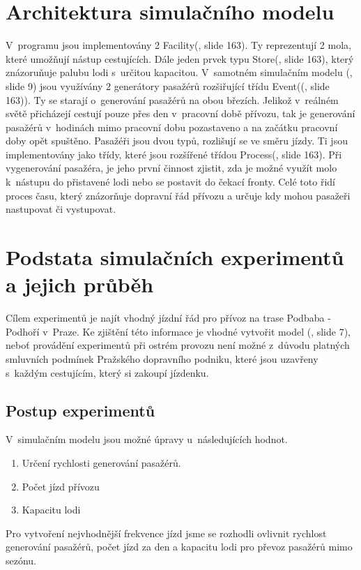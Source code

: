 \documentclass[11pt,a4paper]{article}
\begin{document}
	\section{Architektura simulačního modelu}
	V~programu jsou implementovány 2 Facility(\cite{SLAJD}, slide 163). Ty reprezentují 2 mola, které umožňují nástup cestujících.
    Dále jeden prvek typu Store(\cite{SLAJD}, slide 163), který znázoruňuje palubu lodi s~určitou kapacitou. V~samotném simulačním
	modelu (\cite{SLAJD}, slide 9) jsou využívány 2 generátory pasažérů rozšiřující třídu Event((\cite{SLAJD}, slide 163)). Ty se starají o~generování
	pasažérů na obou březích. Jelikož v~reálném světě přicházejí cestují pouze přes den v~pracovní době přívozu,
	tak je generování pasažérů v~hodinách mimo pracovní dobu pozastaveno a na začátku pracovní doby opět spuštěno.
	Pasažéři jsou dvou typů, rozlišují se ve směru jízdy. Ti jsou implementovány jako třídy, které jsou rozšířené
	třídou Process(\cite{SLAJD}, slide 163). Při vygenerování pasažéra, je jeho první činnost zjistit, zda je možné využít molo k~nástupu
	do přistavené lodi nebo se postavit do čekací fronty. Celé toto řidí proces času, který znázorňuje
	dopravní řád přívozu a určuje kdy mohou pasažeři nastupovat či vystupovat.

	\section{Podstata simulačních experimentů a jejich průběh}

	Cílem experimentů je najít vhodný jízdní řád pro přívoz na trase Podbaba - Podhoří v~Praze.
	Ke zjištění této informace je vhodné vytvořit model (\cite{SLAJD}, slide 7),
	neboť provádění experimentů při ostrém provozu není možné z~důvodu platných smluvních
	podmínek Pražského dopravního podniku, které jsou uzavřeny s~každým cestujícím, který
	si zakoupí jízdenku.
	\subsection{Postup experimentů}
  V~simulačním modelu jsou možné úpravy u~následujících hodnot.
	\begin{enumerate}
		\item Určení rychlosti generování pasažérů.
		\item Počet jízd přívozu
		\item Kapacitu lodi
	\end{enumerate}

	Pro vytvoření nejvhodnější frekvence jízd jsme se rozhodli ovlivnit rychlost
	generování pasažérů, počet jízd za den a kapacitu lodi pro převoz pasažérů mimo
	sezónu.
\end{document}

